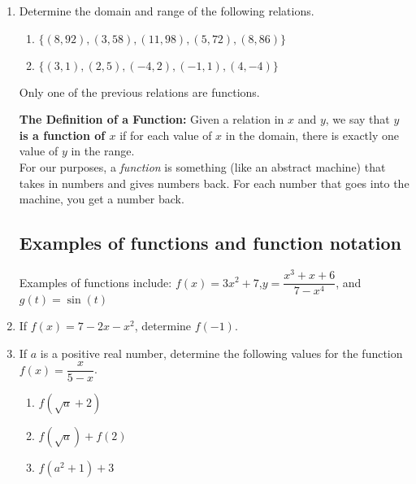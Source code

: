 \begin{enumerate}
\item Determine the domain and range of the following relations.
\begin{enumerate}
\item $\{(8,92), (3,58), (11,98), (5,72), (8,86) \}$
  \vfill
\item $\{(3,1), (2,5), (-4,2), (-1,1), (4,-4) \}$
  \vfill
\end{enumerate}

Only one of the previous relations are functions.

\clearpage

\noindent \textbf{The Definition of a Function:}  Given a relation in $x$ and $y$, we say that \textbf{$y$ is a function of $x$} if for each value of $x$ in the domain, there is exactly one value of $y$ in the range.\\

For our purposes, a \emph{function} is something (like an abstract machine) that takes in numbers and gives numbers back.  For each number that goes into the machine, you get a number back.



 \subsection{Examples of functions and function notation}
Examples of functions include: $f(x) = 3x^2 +7$,\quad  $y =
\dfrac{x^3+x+6}{7-x^4}$, and $g(t) = \sin(t)$

\vfill

\item If $f(x)= 7 - 2x - x^2$, determine $f(-1)$.

  \vfill

\item If $a$ is a positive real number, determine the following values for the function $f(x) = \dfrac{x}{5-x}$.

\begin{enumerate}

\item $f(\sqrt{a}+2)$

  \vfill

\item $f(\sqrt{a})+f(2)$

  \vfill


\item $f(a^2+1)+3$
  \vfill
  
\end{enumerate}



\end{enumerate}
